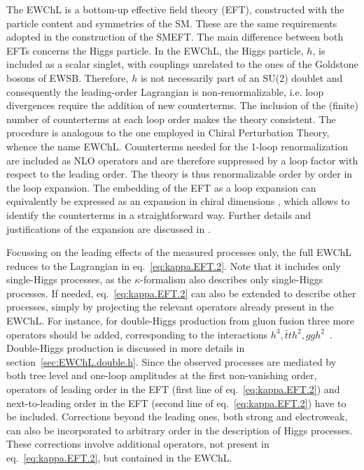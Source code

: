 The EWChL\cite{Dobado:1989ax,Dobado:1989ue,Dobado:1990zh,Dobado:1990jy,Espriu:1991vm,Herrero:1993nc,Herrero:1994iu,Feruglio:1992wf,Bagger:1993zf,Koulovassilopoulos:1993pw,Burgess:1999ha,Wang:2006im,Grinstein:2007iv,Azatov:2012bz,Alonso:2012px,Buchalla:2012qq,Buchalla:2013rka,Buchalla:2013eza} is a bottom-up effective field theory (EFT), constructed with the particle content and symmetries of the SM. These are the same requirements adopted in the construction of the SMEFT. The main difference between both EFTs concerns the Higgs particle. In the EWChL, the Higgs particle, $h$, is included as a scalar singlet, with couplings unrelated to the ones of the Goldstone bosons of EWSB. Therefore, $h$ is not necessarily part of an SU(2) doublet and consequently the leading-order Lagrangian is non-renormalizable, i.e. loop divergences require the addition of new counterterms. The inclusion of the (finite) number of counterterms at each loop order makes the theory consistent. The procedure is analogous to the one employed in Chiral Perturbation Theory, whence the name EWChL. Counterterms needed for the 1-loop renormalization\cite{Guo:2015isa,Buchalla:2017jlu,Alonso:2017tdy} are included as NLO operators\cite{Buchalla:2013rka} and are therefore suppressed by a loop factor with respect to the leading order. The theory is thus renormalizable order by order in the loop expansion. The embedding of the EFT as a loop expansion can equivalently be expressed as an expansion in chiral dimensions \cite{Buchalla:2013eza}, which allows to identify the counterterms in a straightforward way. Further details and justifications of the expansion are discussed in \cite{Buchalla:2013rka,Buchalla:2013eza,Buchalla:2015wfa,Buchalla:2016sop}.

Focussing on the leading effects of the measured processes only, the full EWChL reduces to the Lagrangian in eq.~\eqref{eq:kappa.EFT.2}. Note that it includes only single-Higgs processes, as the $\kappa$-formalism also describes only single-Higgs processes. If needed, eq.~\eqref{eq:kappa.EFT.2} can also be extended to describe other processes, simply by projecting the relevant operators already present in the EWChL. For instance, for double-Higgs production from gluon fusion three more operators should be added, corresponding to the interactions $h^{3},\bar{t}th^{2},ggh^{2}$~\cite{Grober:2015cwa,deFlorian:2016spz,Kim:2018uty,Buchalla:2018yce}. Double-Higgs production is discussed in more details in section~\ref{sec:EWChL.double.h}. Since the observed processes are mediated by both tree level and one-loop amplitudes at the first non-vanishing order, operators of leading order in the EFT (first line of eq.~\eqref{eq:kappa.EFT.2}) and next-to-leading order in the EFT (second line of eq.~\eqref{eq:kappa.EFT.2}) have to be included\cite{Buchalla:2015wfa}. Corrections beyond the leading ones, both strong and electroweak, can also be incorporated to arbitrary order in the description of Higgs processes. These corrections involve additional operators, not present in eq.~\eqref{eq:kappa.EFT.2}, but contained in the EWChL.


